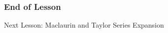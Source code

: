 \documentclass[xcolor=dvipsnames]{beamer}
\begin{document}




\begin{frame}
  \frametitle{End of Lesson}
Next Lesson: Maclaurin and Taylor Series Expansion
\end{frame}
\end{document}
